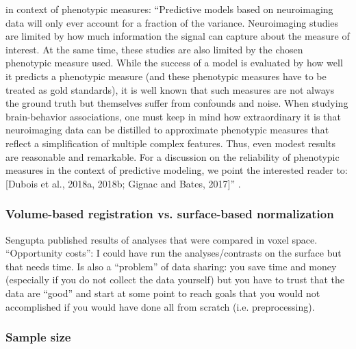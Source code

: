 %
\citet{scheinost2019ten} in context of phenotypic measures:
%
``Predictive models based on neuroimaging data will only ever account for a
fraction of the variance.
%
Neuroimaging studies are limited by how much information the signal can capture
about the measure of interest.
%
At the same time, these studies are also limited by the chosen phenotypic
measure used.
%
While the success of a model is evaluated by how well it predicts a phenotypic
measure (and these phenotypic measures have to be treated as gold standards), it
is well known that such measures are not always the ground truth but themselves
suffer from confounds and noise.
%
When studying brain-behavior associations, one must keep in mind how
extraordinary it is that neuroimaging data can be distilled to approximate
phenotypic measures that reflect a simplification of multiple complex features.
%
Thus, even modest results are reasonable and remarkable.
%
For a discussion on the reliability of phenotypic measures in the context of
predictive modeling, we point the interested reader to: [Dubois et al., 2018a,
2018b; Gignac and Bates, 2017]'' \citep{scheinost2019ten}.




\subsubsection{Volume-based registration vs. surface-based normalization}



%
Sengupta published results of analyses that were compared in voxel space.
%
``Opportunity costs'': I could have run the analyses/contrasts on the surface
but that needs time.
%
Is also a ``problem'' of data sharing: you save time and money (especially if
you do not collect the data yourself) but you have to trust that the data are
``good'' and start at some point to reach goals that you would not accomplished
if you would have done all from scratch (i.e. preprocessing).



\subsubsection{Sample size}

